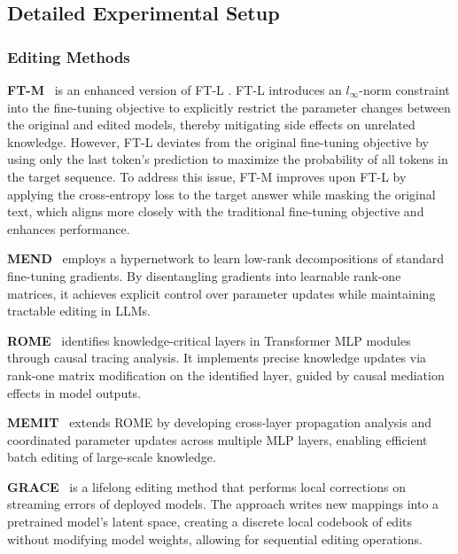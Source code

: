 \subsection{Detailed Experimental Setup}
\label{apd:exp_setup}

\subsubsection{Editing Methods}

\textbf{FT-M}~\cite{zhang2024comprehensivestudyknowledgeediting} is an  enhanced version of FT-L \cite{zhu2020modifyingmemoriestransformermodels, meng2023locating}.
FT-L introduces an $l_{\infty}$-norm constraint into the fine-tuning objective to explicitly restrict the parameter changes between the original and edited models, thereby mitigating side effects on unrelated knowledge.
However, FT-L deviates from the original fine-tuning objective by using only the last token's prediction to maximize the probability of all tokens in the target sequence. To address this issue, FT-M improves upon FT-L by applying the cross-entropy loss to the target answer while masking the original text, which aligns more closely with the traditional fine-tuning objective and enhances performance. 

\noindent \textbf{MEND}~\cite{mitchell2022fast} employs a hypernetwork to learn low-rank decompositions of standard fine-tuning gradients. 
By disentangling gradients into learnable rank-one matrices, it achieves explicit control over parameter updates while maintaining tractable editing in LLMs.

\noindent \textbf{ROME}~\cite{meng2023locating} identifies knowledge-critical layers in Transformer MLP modules through causal tracing analysis. 
It implements precise knowledge updates via rank-one matrix modification on the identified layer, guided by causal mediation effects in model outputs.

\noindent \textbf{MEMIT}~\cite{meng2023massediting} extends ROME by developing cross-layer propagation analysis and coordinated parameter updates across multiple MLP layers, enabling efficient batch editing of large-scale knowledge.

\noindent \textbf{GRACE}~\cite{hartvigsen2023aging} is a lifelong editing method that performs local corrections on streaming errors of deployed models. The approach writes new mappings into a pretrained model's latent space, creating a discrete local codebook of edits without modifying model weights, allowing for sequential editing operations.

